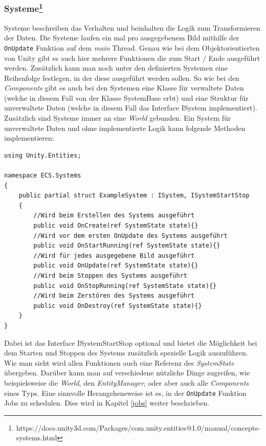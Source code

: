 \subsubsection{Systeme\footnote{https://docs.unity3d.com/Packages/com.unity.entities@1.0/manual/concepts-systems.html}}
Systeme beschreiben das Verhalten und beinhalten die Logik zum Transformieren der Daten. Die Systeme laufen ein mal pro ausgegebenem Bild mithilfe der \texttt{OnUpdate} Funktion auf dem \textit{main} Thread. Genau wie bei dem Objektorientierten von Unity gibt es auch hier mehrere Funktionen die zum Start / Ende ausgeführt werden. Zusätzlich kann man noch unter den definierten Systemen eine Reihenfolge festlegen, in der diese ausgeführt werden sollen. So wie bei den \textit{Components} gibt es auch bei den Systemen eine Klasse für verwaltete Daten (welche in diesem Fall von der Klasse SystemBase erbt) und eine Struktur für unverwaltete Daten (welche in diesem Fall das Interface ISystem implementiert). Zusätzlich sind Systeme immer an eine \textit{World} gebunden. Ein System für unverwaltete Daten und ohne implementierte Logik kann folgende Methoden implementieren:
\begin{lstlisting}[style=code, caption={System Beispiel}]
using Unity.Entities;

namespace ECS.Systems
{
    public partial struct ExampleSystem : ISystem, ISystemStartStop
    {
        //Wird beim Erstellen des Systems ausgeführt
        public void OnCreate(ref SystemState state){}
        //Wird vor dem ersten OnUpdate des Systems ausgeführt
        public void OnStartRunning(ref SystemState state){}
        //Wird für jedes ausgegebene Bild ausgeführt
        public void OnUpdate(ref SystemState state){}
        //Wird beim Stoppen des Systems ausgeführt
        public void OnStopRunning(ref SystemState state){}
        //Wird beim Zerstören des Systems ausgeführt
        public void OnDestroy(ref SystemState state){}
    }
}
\end{lstlisting}
Dabei ist das Interface ISystemStartStop optional und bietet die Möglichkeit bei dem Starten und Stoppen des Systems zusätzlich spezielle Logik auszuführen. Wie man sieht wird allen Funktionen auch eine Referenz des \textit{SystemState} übergeben. Darüber kann man auf verschiedene nützliche Dinge zugreifen, wie beispielsweise die \textit{World}, den \textit{EntityManager}, oder aber auch alle \textit{Components} eines Typs. Eine sinnvolle Herangehensweise ist es, in der \texttt{OnUpdate} Funktion Jobs zu schedulen. Dies wird in Kapitel \ref{jobs} weiter beschrieben.
